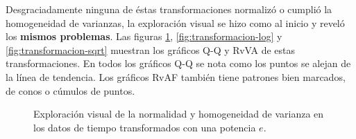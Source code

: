 Desgraciadamente ninguna de éstas transformaciones normalizó o cumplió la homogeneidad de varianzas, la exploración visual se hizo como al inicio y reveló los \textbf{mismos problemas}. Las figuras \ref{fig:transformacion-e}, \ref{fig:transformacion-log} y \ref{fig:transformacion-sqrt} muestran los gráficos Q-Q y RvVA de estas transformaciones. En todos los gráficos Q-Q se nota como los puntos se alejan de la línea de tendencia. Los gráficos RvAF también tiene patrones bien marcados, de conos o cúmulos de puntos.



\begin{figure}[H]
\centering
\caption{Exploración visual de la normalidad y homogeneidad de varianza en los datos de tiempo transformados con una potencia $e$.}
\label{fig:transformacion-e}
\end{figure}


